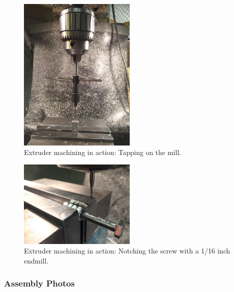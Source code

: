 \begin{figure}[h!]
\centering
\includegraphics[width=0.5\textwidth]{./figures/extruder-tap}
\caption{Extruder machining in action: Tapping on the mill.}
\label{fig:extruder-tap}
\end{figure}

\begin{figure}[h!]
\centering
\includegraphics[width=0.5\textwidth]{./figures/extruder-screw-mill}
\caption{Extruder machining in action: Notching the screw with a 1/16 inch endmill.}
\label{fig:extruder-screw-mill}
\end{figure}

\clearpage

\subsubsection{Assembly Photos}


\indent

